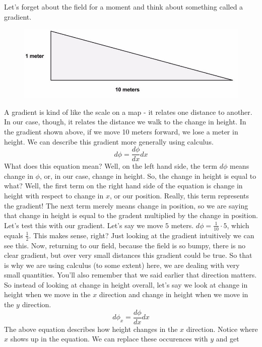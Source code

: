 Let's forget about the field for a moment and think about something called a gradient.
\begin{figure}[H]
\includegraphics[scale=0.25]{gradient.jpg}
\end{figure}
A gradient is kind of like the scale on a map - it relates one distance to another. In our case, though, it relates the distance we walk to the change in height. In the gradient shown above, if we move 10 meters forward, we lose a meter in height. We can describe this gradient more generally using calculus. 
\begin{equation*}
d\phi=\frac{d\phi}{dx}dx
\end{equation*}
What does this equation mean? Well, on the left hand side, the term $d\phi$ means change in $\phi$, or, in our case, change in height. So, the change in height is equal to what? Well, the first term on the right hand side of the equation is change in height with respect to change in $x$, or our position. Really, this term represents the gradient! The next term merely means change in position, so we are saying that change in height is equal to the gradent multiplied by the change in position.
Let's test this with our gradient. Let's say we move $5$ meters. $d\phi=\frac{1}{10}\cdot 5$, which equals $\frac{1}{2}$. This makes sense, right? Just looking at the gradient intuitively we can see this.
Now, returning to our field, because the field is so bumpy, there is no clear gradient, but over very small distances this gradient could be true. So that is why we are using calculus (to some extent) here, we are dealing with very small quantities.
You'll also remember that we said earlier that direction matters. So instead of looking at change in height overall, let's say we look at change in height when we move in the $x$ direction and change in height when we move in the $y$ direction.
\begin{equation*}
d\phi_x=\frac{d\phi}{dx}dx
\end{equation*}
The above equation describes how height changes in the $x$ direction. Notice where $x$ shows up in the equation. We can replace these occurences with $y$ and get
